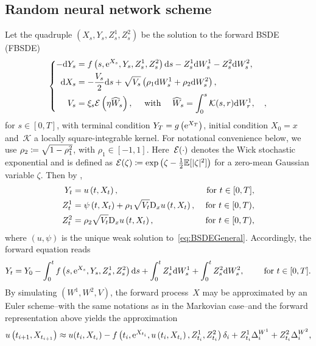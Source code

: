 \subsection{Random neural network scheme}
Let the quadruple $\left(X_{s}, Y_{s}, Z^1_{s}, Z^2_{s}\right)$ be the solution to the forward BSDE (FBSDE)
\begin{equation}\label{eq:logprocess}
\left\{\begin{aligned}
-\mathrm{d} Y_{s} &=f\left(s, \mathrm{e}^{X_{s}}, Y_{s}, Z^1_{s}, Z^2_{s}\right) \mathrm{d} s- Z^1_{s} \mathrm{d} W^1_{s}-Z^2_{s} \mathrm{d} W^2_{s},\\
\mathrm{d} X_{s} &=-\frac{V_{s}}{2} \mathrm{d} s+\sqrt{V_{s}}\left(\rho_1 \mathrm{d} W^1_{s} + \rho_2\mathrm{d} W^2_{s}\right),\\
V_{s} &= \xi_{s} \mathcal{E}\left(\eta \widehat{W}_{s}\right), \quad \text { with } \quad \widehat{W}_{s}=\int_{0}^{s} \mathcal{K}(s, r) \mathrm{d} W^1_{r}, \quad ,
\end{aligned}\right.
\end{equation}
for $s \in[0, T]$, with terminal condition
$Y_{T} = g\left(\mathrm{e}^{X_{T}}\right)$, initial condition
$X_{0} = x$ and~$\mathcal{K}$ a locally square-integrable kernel. 
For notational convenience below, 
we use $\rho_2 \coloneqq  \sqrt{1-\rho_1^2}$, with 
$\rho_1 \in [-1,1]$.
Here~$\mathcal{E}(\cdot)$ denotes the Wick stochastic exponential and is defined as $\mathcal{E}(\zeta)\coloneqq \exp\left(\zeta-\frac12\mathbb{E}[|\zeta|^2]\right)$ for a zero-mean Gaussian variable $\zeta$. 
Then by \cite[Theorem~2.4]{Bayer2022PricingSPDEs},
\begin{align}
Y_{t} &= u\left(t, X_{t}\right),  & \text{ for } t\in[0,T], \\
Z^1_{t} &= \psi\left(t, X_{t}\right) + 
\rho_1 \sqrt{V_{t}} \mathrm{D}_{x} u\left(t, X_{t}\right), & \textup{ for } t\in[0,T), \\
Z^2_{t} &= \rho_2\sqrt{V_{t}} \mathrm{D}_{x} u\left(t, X_{t}\right), & \textup{ for } t\in[0,T),
\end{align}
where $(u, \psi)$ is the unique weak solution to~\eqref{eq:BSDEGeneral}. Accordingly, the forward equation reads
\begin{equation*}
Y_t = Y_0-\int_{0}^{t} f\left(s, \mathrm{e}^{X_{s}}, Y_s, Z_s^1, Z_s^2\right) \mathrm{d} s +\int_{0}^{t}Z_s^1 \mathrm{d} W^1_{s}+\int_{0}^{t} Z_s^2 \mathrm{d} W^2_{s},
\qquad\text{ for }t \in[0, T].
\end{equation*}
By simulating $(W^1, W^2, V)$, 
the forward process~$X$ may be approximated by an Euler scheme--with the same notations as in the Markovian case--and the forward representation above yields the approximation
$$
u\left(t_{i+1}, X_{t_{i+1}}\right) \approx u(t_{i}, X_{t_i}) - f\left(t_i, \mathrm{e}^{X_{t_{i}}}, u\left({t_{i}}, X_{t_{i}}\right), Z^1_{t_i}, Z^2_{t_i}\right) \delta_{i}  + Z^1_{t_i} \Delta^{W^1}_{i} + Z^2_{t_i} \Delta^{W^2}_{i},
$$
